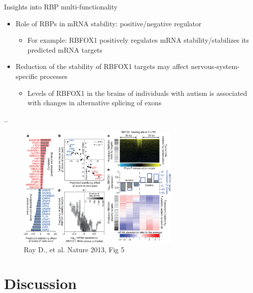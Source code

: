 \documentclass[professionalfont, 12pt, default]{beamer}
\providecommand{\tightlist}{%
    \setlength{\itemsep}{0pt}\setlength{\parskip}{0pt}}
\begin{document}
\begin{frame}{Insights into RBP multi-functionality}

\begin{itemize}
\tightlist
\item
  Role of RBPs in mRNA stability: positive/negative regulator

  \begin{itemize}
  \tightlist
  \item
    For example: RBFOX1 positively regulates mRNA stability/stabilizes
    its predicted mRNA targets
  \end{itemize}
\item
  Reduction of the stability of RBFOX1 targets may affect
  nervous-system-specific processes

  \begin{itemize}
  \tightlist
  \item
    Levels of RBFOX1 in the brains of individuals with autism is
    associated with changes in alternative splicing of exons
  \end{itemize}
\end{itemize}

\end{frame}

\begin{frame}{..}

\begin{figure}
\centering
\includegraphics[width=0.70000\textwidth]{img/f5.jpg}
\caption{Ray D., et al. Nature 2013, Fig 5}
\end{figure}

\end{frame}

\section{Discussion}\label{discussion}
\end{document}
